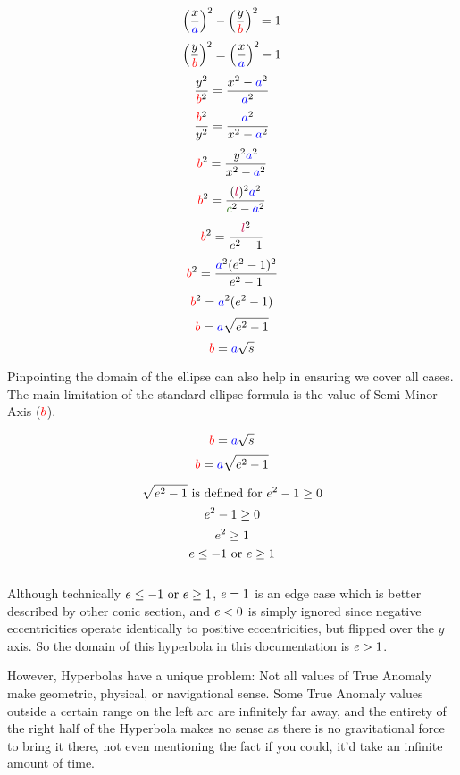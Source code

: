 \begin{multicols}{2}
\raggedcolumns
$$\left(\frac{x}{\textcolor{blue}{a}}\right)^2 - \left(\frac{y}{\textcolor{red}{b}}\right)^2 = 1$$
$$\left(\frac{y}{\textcolor{red}{b}}\right)^2 = \left(\frac{x}{\textcolor{blue}{a}}\right)^2 - 1$$
$$\frac{y^2}{\textcolor{red}{b}^2} = \frac{x^2 - \textcolor{blue}{a}^2}{\textcolor{blue}{a}^2}$$
$$\frac{\textcolor{red}{b}^2}{y^2} = \frac{\textcolor{blue}{a}^2}{x^2 - \textcolor{blue}{a}^2}$$
$$\textcolor{red}{b}^2 = \frac{y^2\textcolor{blue}{a}^2}{x^2-\textcolor{blue}{a}^2}$$
$$\textcolor{red}{b}^2 = \frac{(\textcolor{purple}{l})^2\textcolor{blue}{a}^2}{\textcolor{OliveGreen}{c}^2 - \textcolor{blue}{a}^2}$$
$$\textcolor{red}{b}^2 = \frac{\textcolor{purple}{l}^2} {\textcolor{black}{e}^2 - 1}$$
$$\textcolor{red}{b}^2 = \frac{\textcolor{blue}{a}^2(\textcolor{black}{e}^2-1)^2} {\textcolor{black}{e}^2 - 1}$$
$$\textcolor{red}{b}^2 = \textcolor{blue}{a}^2(\textcolor{black}{e}^2-1)$$
$$\textcolor{red}{b} = \textcolor{blue}{a}\sqrt{\textcolor{black}{e}^2-1}$$
$$\textcolor{red}{b} = \textcolor{blue}{a}\sqrt{\textcolor{black}{s}}$$
\end{multicols}

Pinpointing the domain of the ellipse can also help in ensuring we cover all cases. The main limitation of the standard ellipse formula is the value of Semi Minor Axis ($\textcolor{red}{b}$).

$$\textcolor{red}{b} = \textcolor{blue}{a}\sqrt{\textcolor{black}{s}}$$
$$\textcolor{red}{b} = \textcolor{blue}{a}\sqrt{\textcolor{black}{e}^2-1}$$

$$\sqrt{\textcolor{black}{e}^2-1}\text{  is defined for  } \textcolor{black}{e}^2-1 \geq 0$$
$$\textcolor{black}{e}^2-1 \geq 0$$
$$\textcolor{black}{e}^2 \geq 1$$
$$\textcolor{black}{e}\leq-1\text{ or } \textcolor{black}{e} \geq 1$$\\

Although technically $\textcolor{black}{e}\leq-1\text{ or } \textcolor{black}{e} \geq 1$, $\textcolor{black}{e} = 1$ is an edge case which is better described by other conic section, and $\textcolor{black}{e} < 0$ is simply ignored since negative eccentricities operate identically to positive eccentricities, but flipped over the $y$ axis. So the domain of this hyperbola in this documentation is $\textcolor{black}{e} > 1$.

However, Hyperbolas have a unique problem: Not all values of True Anomaly make geometric, physical, or navigational sense. Some True Anomaly values outside a certain range on the left arc are infinitely far away, and the entirety of the right half of the Hyperbola makes no sense as there is no gravitational force to bring it there, not even mentioning the fact if you could, it'd take an infinite amount of time.

